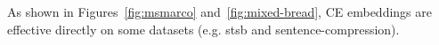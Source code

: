 As shown in Figures~\ref{fig:msmarco} and~\ref{fig:mixed-bread}, CE embeddings are effective directly on some datasets (e.g. stsb and sentence-compression).%




